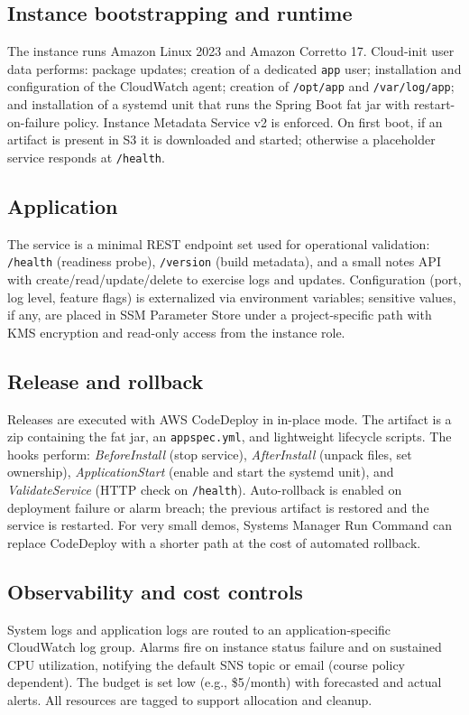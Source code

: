 \documentclass[12pt]{article}
\begin{document}
\subsection{Instance bootstrapping and runtime}
The instance runs Amazon Linux 2023 and Amazon Corretto 17. Cloud-init user data performs: package updates; creation of a dedicated \texttt{app} user; installation and configuration of the CloudWatch agent; creation of \texttt{/opt/app} and \texttt{/var/log/app}; and installation of a systemd unit that runs the Spring Boot fat jar with restart-on-failure policy. Instance Metadata Service v2 is enforced. On first boot, if an artifact is present in S3 it is downloaded and started; otherwise a placeholder service responds at \texttt{/health}.

\subsection{Application}
The service is a minimal REST endpoint set used for operational validation: \texttt{/health} (readiness probe), \texttt{/version} (build metadata), and a small notes API with create/read/update/delete to exercise logs and updates. Configuration (port, log level, feature flags) is externalized via environment variables; sensitive values, if any, are placed in SSM Parameter Store under a project-specific path with KMS encryption and read-only access from the instance role.

\subsection{Release and rollback}
Releases are executed with AWS CodeDeploy in in-place mode. The artifact is a zip containing the fat jar, an \texttt{appspec.yml}, and lightweight lifecycle scripts. The hooks perform: \emph{BeforeInstall} (stop service), \emph{AfterInstall} (unpack files, set ownership), \emph{ApplicationStart} (enable and start the systemd unit), and \emph{ValidateService} (HTTP check on \texttt{/health}). Auto-rollback is enabled on deployment failure or alarm breach; the previous artifact is restored and the service is restarted. For very small demos, Systems Manager Run Command can replace CodeDeploy with a shorter path at the cost of automated rollback.

\subsection{Observability and cost controls}
System logs and application logs are routed to an application-specific CloudWatch log group. Alarms fire on instance status failure and on sustained CPU utilization, notifying the default SNS topic or email (course policy dependent). The budget is set low (e.g., \$5/month) with forecasted and actual alerts. All resources are tagged to support allocation and cleanup.
\end{document}
